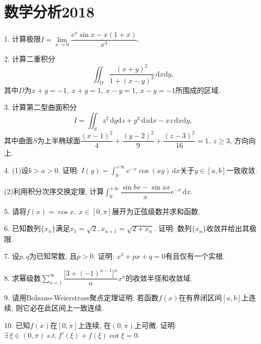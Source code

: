 \documentclass[12pt, a4paper, twoside]{ctexart}%
\newcommand{\rmd}{\mathrm{d}} %
\begin{document}
	\section{数学分析2018}
	1. 计算极限$I=\lim\limits_{x\rightarrow 0}\dfrac{e^x\sin x-x(1+x)}{x^3}$.\par 
	2. 计算二重积分\[
	\iint_D\dfrac{(x+y)^2}{1+(x-y)^2}\,\rmd x\rmd y,\]
	其中$D$为$x+y=-1,\ x+y=1,\ x-y=1,\ x-y=-1$所围成的区域.\par
	3. 计算第二型曲面积分\[
	I=\iint_{S}z^2\,\rmd y\rmd z+y^2\,\rmd z\rmd x-xz\,\rmd x\rmd y,\]
	其中曲面$S$为上半椭球面$\dfrac{(x-1)^2}{4}+\dfrac{(y-2)^2}{9}+\dfrac{(z-3)^2}{16}=1,\ z\ge 3$, 方向向上.\par
	4. (1)设$b>a>0$. 证明: $I(y)=\int_0^{+\infty}e^{-x}\cos(xy)\,\rmd x$关于$y\in[a,b]$一致收敛.\par
	\hspace{1.2em}(2)利用积分次序交换定理, 计算$\int_0^{+\infty}\dfrac{\sin bx-\sin ax}{x}e^{-x}\,\rmd x$.\par
	5. 请将$f(x)=\cos x,\ x\in[0,\pi]$展开为正弦级数并求和函数.\par
	6. 已知数列$\{x_n\}$满足$x_1=\sqrt{2}, x_{n+1}=\sqrt{2+x_n}$. 证明: 数列$\{x_n\}$收敛并给出其极限.\par
	7. 设$p,q$为已知常数, 且$p>0$. 证明: $x^3+px+q=0$有且仅有一个实根.\par
	8. 求幂级数$\sum\limits_{n=1}^\infty\dfrac{\big[3+(-1)^{n-1}\big]^n}{n}x^n$的收敛半径和收敛域.\par
	9. 请用Bolzano-Weierstrass聚点定理证明: 若函数$f(x)$在有界闭区间$[a,b]$上连续, 则它必在此区间上一致连续.\par
	10. 已知$f(x)\mbox{在}[0,\pi]$上连续, 在$(0,\pi)$上可微. 证明: $\exists\ \xi\in(0,\pi)\ s.t.\ f'(\xi)+f(\xi)\cot\xi=0$.\par 
	
	\clearpage
\end{document}
